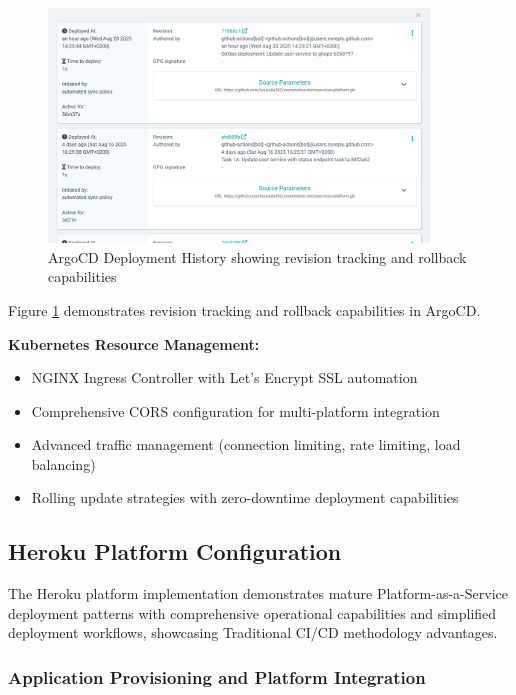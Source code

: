 \begin{figure}[H]
\centering
\includegraphics[width=0.9\textwidth]{figures/chapter5/argocd-deployment-history.png}
\caption{ArgoCD Deployment History showing revision tracking and rollback capabilities}
\label{fig:argocd-deployment-history}
\end{figure}

Figure \ref{fig:argocd-deployment-history} demonstrates revision tracking and rollback capabilities in ArgoCD.


\textbf{Kubernetes Resource Management:}
\begin{itemize}
\item NGINX Ingress Controller with Let's Encrypt SSL automation
\item Comprehensive CORS configuration for multi-platform integration
\item Advanced traffic management (connection limiting, rate limiting, load balancing)
\item Rolling update strategies with zero-downtime deployment capabilities
\end{itemize}

\subsection{Heroku Platform Configuration}

The Heroku platform implementation demonstrates mature Platform-as-a-Service deployment patterns with comprehensive operational capabilities and simplified deployment workflows, showcasing Traditional CI/CD methodology advantages.

\subsubsection{Application Provisioning and Platform Integration}



